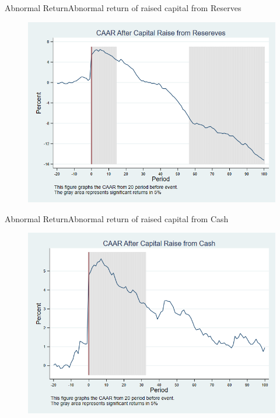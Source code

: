 \documentclass{beamer}
\begin{document}
\begin{frame}{Abnormal Return}{Abnormal return of raised capital from Reserves}
\label{abreturnsaving}
\begin{figure}
\centering
\includegraphics[width=0.65\linewidth]{AbReturnSaving}
\label{fig:abreturnsaving}
\end{figure}

\hfill\hyperlink{abreturnsaving4Factor}{}
\end{frame}




\begin{frame}{Abnormal Return}{Abnormal return of raised capital from Cash}
\label{abreturncash}
\begin{figure}
\centering
\includegraphics[width=0.65\linewidth]{AbReturnCash}
\label{fig:abreturncash}
\end{figure}
\hfill\hyperlink{abreturncash4Factor}{}
\end{frame}
\end{document}
